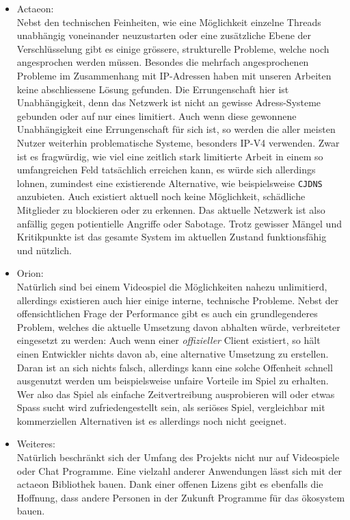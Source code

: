 \documentclass[11pt]{article}
\begin{document}
\begin{itemize}
\item Actaeon: \\
Nebst den technischen Feinheiten, wie eine Möglichkeit einzelne
Threads unabhängig voneinander neuzustarten oder eine zusätzliche
Ebene der Verschlüsselung gibt es einige grössere, strukturelle
Probleme, welche noch angesprochen werden müssen. Besondes die
mehrfach angesprochenen Probleme im Zusammenhang mit IP-Adressen
haben mit unseren Arbeiten keine abschliessene Lösung gefunden. Die
Errungenschaft hier ist Unabhängigkeit, denn das Netzwerk ist nicht
an gewisse Adress-Systeme gebunden oder auf nur eines limitiert.
Auch wenn diese gewonnene Unabhängigkeit eine Errungenschaft für
sich ist, so werden die aller meisten Nutzer weiterhin
problematische Systeme, besonders IP-V4 verwenden. Zwar ist es
fragwürdig, wie viel eine zeitlich stark limitierte Arbeit in einem
so umfangreichen Feld tatsächlich erreichen kann, es würde sich
allerdings lohnen, zumindest eine existierende Alternative, wie
beispielsweise \texttt{CJDNS} anzubieten. Auch existiert aktuell noch keine
Möglichkeit, schädliche Mitglieder zu blockieren oder zu erkennen.
Das aktuelle Netzwerk ist also anfällig gegen potientielle Angriffe
oder Sabotage. Trotz gewisser Mängel und Kritikpunkte ist das
gesamte System im aktuellen Zustand funktionsfähig und nützlich.
\item Orion: \\
Natürlich sind bei einem Videospiel die Möglichkeiten nahezu
unlimitierd, allerdings existieren auch hier einige interne,
technische Probleme. Nebst der offensichtlichen Frage der
Performance gibt es auch ein grundlegenderes Problem, welches die
aktuelle Umsetzung davon abhalten würde, verbreiteter eingesetzt zu
werden: Auch wenn einer \emph{offizieller} Client existiert, so hält einen
Entwickler nichts davon ab, eine alternative Umsetzung zu erstellen.
Daran ist an sich nichts falsch, allerdings kann eine solche
Offenheit schnell ausgenutzt werden um beispielsweise unfaire
Vorteile im Spiel zu erhalten. Wer also das Spiel als einfache
Zeitvertreibung ausprobieren will oder etwas Spass sucht wird
zufriedengestellt sein, als seriöses Spiel, vergleichbar mit
kommerziellen Alternativen ist es allerdings noch nicht geeignet.
\item Weiteres: \\
Natürlich beschränkt sich der Umfang des Projekts nicht nur auf
Videospiele oder Chat Programme. Eine vielzahl anderer Anwendungen
lässt sich mit der actaeon Bibliothek bauen. Dank einer offenen
Lizens gibt es ebenfalls die Hoffnung, dass andere Personen in der
Zukunft Programme für das ökosystem bauen.
\newpage
\end{itemize}
\end{document}
